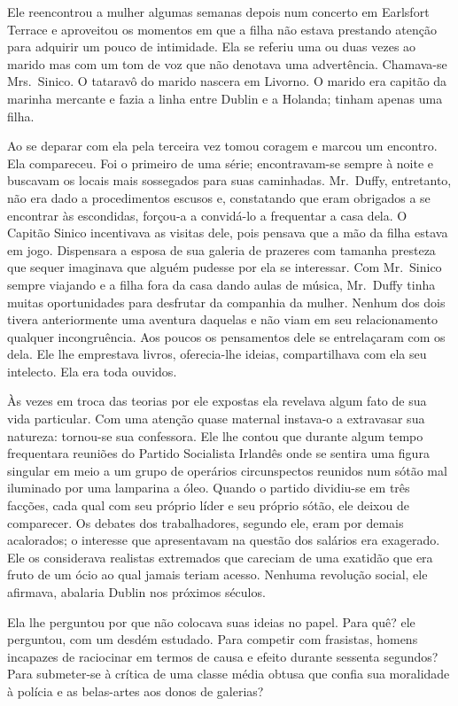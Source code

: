 Ele reencontrou a mulher algumas semanas depois num concerto em Earlsfort
Terrace e aproveitou os momentos em que a filha não estava prestando atenção
para adquirir um pouco de intimidade.  Ela se referiu uma ou duas vezes ao
marido mas com um tom de voz que não denotava uma advertência.  Chamava-se 
Mrs.~Sinico.  O tataravô do marido nascera em Livorno.  O marido era capitão da
marinha mercante e fazia a linha entre Dublin e a Holanda; tinham apenas uma
filha.

Ao se deparar com ela pela terceira vez tomou coragem e marcou um encontro.
Ela compareceu.  Foi o primeiro de uma série; encontravam-se sempre à noite e
buscavam os locais mais sossegados para suas caminhadas.  Mr.~Duffy,
entretanto, não era dado a procedimentos escusos e, constatando que eram
obrigados a se encontrar às escondidas, forçou-a a convidá-lo a frequentar a
casa dela.  O Capitão Sinico incentivava as visitas dele, pois pensava que a
mão da filha estava em jogo.  Dispensara a esposa de sua galeria de prazeres
com tamanha presteza que sequer imaginava que alguém pudesse por ela se
interessar.  Com Mr.~Sinico sempre viajando e a filha fora da casa dando aulas
de música, Mr.~Duffy tinha muitas oportunidades para desfrutar da companhia da
mulher.  Nenhum dos dois tivera anteriormente uma aventura daquelas e não viam
em seu relacionamento qualquer incongruência.  Aos poucos os pensamentos dele
se entrelaçaram com os dela.  Ele lhe emprestava livros, oferecia-lhe ideias,
compartilhava com ela seu intelecto.  Ela era toda ouvidos.

Às vezes em troca das teorias por ele expostas ela revelava algum fato de sua
vida particular.  Com uma atenção quase maternal instava-o a extravasar sua
natureza: tornou-se sua confessora.  Ele lhe contou que durante algum tempo
frequentara reuniões do Partido Socialista Irlandês onde se sentira uma figura
singular em meio a um grupo de operários circunspectos reunidos num sótão mal
iluminado por uma lamparina a óleo.  Quando o partido dividiu-se em três
facções, cada qual com seu próprio líder e seu próprio sótão, ele deixou de
comparecer.  Os debates dos trabalhadores, segundo ele, eram por demais
acalorados; o interesse que apresentavam na questão dos salários era exagerado.
Ele os considerava realistas extremados que careciam de uma exatidão que era
fruto de um ócio ao qual jamais teriam acesso.  Nenhuma revolução social, ele
afirmava, abalaria Dublin nos próximos séculos.

Ela lhe perguntou por que não colocava suas ideias no papel.  Para quê?  ele
perguntou, com um desdém estudado.  Para competir com frasistas, homens
incapazes de raciocinar em termos de causa e efeito durante sessenta segundos?
Para submeter-se à crítica de uma classe média obtusa que confia sua moralidade
à polícia e as belas-artes aos donos de galerias?

